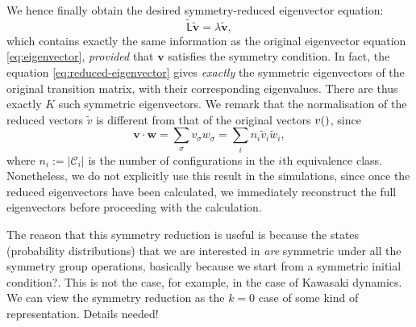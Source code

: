 \documentclass[10pt]{article}
\newcommand{\defeq}{:=}
\newcommand{\vv}{\mathbf{v}}
\newcommand{\w}{\mathbf{w}}
\renewcommand{\v}[1]{v(#1)}
\newcommand{\LL}{\mathsf{L}}
\newcommand{\tL}{\tilde{\LL}}
\newcommand{\tv}{\tilde{v}}
\newcommand{\tvv}{\tilde{\vv}}
\newcommand{\size}[1]{\left| #1 \right|}
\newcommand{\class}{\mathcal{C}}
\newcommand{\transp}{^{\text{\small T}}}
\newcommand{\comment}[1]{{\color{red}#1}}
\begin{document}
We hence finally obtain the desired symmetry-reduced eigenvector equation:
 \begin{equation} \label{eq:reduced-eigenvector}
\tL %
\tvv = \lambda \tvv,
\end{equation}
which contains exactly the same information as the original eigenvector
equation \eqref{eq:eigenvector}, \emph{provided} that $\vv$ satisfies the
symmetry condition.  In fact, the equation \eqref{eq:reduced-eigenvector} gives
\emph{exactly} the symmetric eigenvectors of the original transition
matrix, with their corresponding eigenvalues.  There are thus exactly $K$ such
symmetric eigenvectors.
We remark that the normalisation of the reduced vectors
$\tv$ is different from that of the original vectors $\v$, since
\begin{equation}
 \vv \cdot \w = \sum_{\sigma} v_{\sigma} w_{\sigma} = \sum_i n_i \tv_i
\tilde{w}_i,
\end{equation}
where $n_i \defeq \size{\class_i}$ is the number of configurations in the $i$th
equivalence class. Nonetheless, we do not explicitly use this result in the
simulations, since once the reduced eigenvectors have been calculated, we
immediately reconstruct the full eigenvectors before proceeding with the
calculation.

% 
% 

The reason that this symmetry reduction is useful is because the
states (probability distributions) that we are interested in \emph{are}
symmetric under all the symmetry group operations, \comment{basically because
we start from a symmetric initial condition?}. This is not the case, for
example, in the case of Kawasaki dynamics.  We can view the symmetry reduction
as the $k=0$ case of some kind of representation. \comment{Details needed!}
\end{document}
